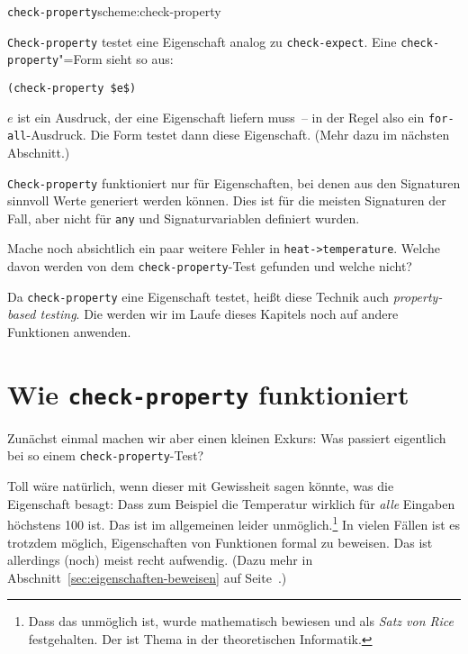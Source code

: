 \begin{feature}{\lstinline{check-property}}{scheme:check-property}

\lstinline{Check-property}
testet eine Eigenschaft analog zu \lstinline{check-expect}.  Eine
\lstinline{check-property}"=Form sieht so aus:
%
\begin{lstlisting}
(check-property $e$) 
\end{lstlisting}
%
$e$ ist ein Ausdruck, der eine Eigenschaft liefern muss~-- in der Regel
also ein \lstinline{for-all}-Ausdruck.  Die Form testet dann diese
Eigenschaft.  (Mehr dazu im nächsten Abschnitt.)

\lstinline{Check-property} funktioniert nur für Eigenschaften, bei
denen aus den Signaturen sinnvoll Werte generiert werden können.  Dies
ist für die meisten Signaturen der Fall, aber nicht für
\lstinline{any} und Signaturvariablen definiert wurden.
\end{feature}

\begin{aufgabeinline}
  Mache noch absichtlich ein paar weitere Fehler in
  \lstinline{heat->temperature}.  Welche davon werden von dem
  \lstinline{check-property}-Test gefunden und welche nicht?
\end{aufgabeinline}

Da \lstinline{check-property} eine Eigenschaft testet, heißt diese
Technik auch \textit{property-based testing}.  Die werden wir im Laufe dieses Kapitels noch auf andere
Funktionen anwenden.

\section{Wie \lstinline{check-property} funktioniert}

Zunächst einmal machen wir aber einen kleinen Exkurs: Was passiert
eigentlich bei so einem \lstinline{check-property}-Test?

Toll wäre natürlich, wenn dieser mit Gewissheit sagen könnte, was die
Eigenschaft besagt: Dass zum Beispiel die Temperatur wirklich für
\emph{alle} Eingaben höchstens 100 ist.  Das ist im allgemeinen leider
unmöglich.\footnote{Dass das unmöglich ist, wurde mathematisch
  bewiesen und als \textit{Satz von Rice} festgehalten.  Der ist Thema
  in der theoretischen Informatik.}  In vielen Fällen ist es trotzdem
möglich, Eigenschaften von Funktionen formal zu beweisen.  Das ist
allerdings (noch) meist recht aufwendig.  (Dazu mehr in
Abschnitt~\ref{sec:eigenschaften-beweisen} auf
Seite~\pageref{sec:eigenschaften-beweisen}.)


